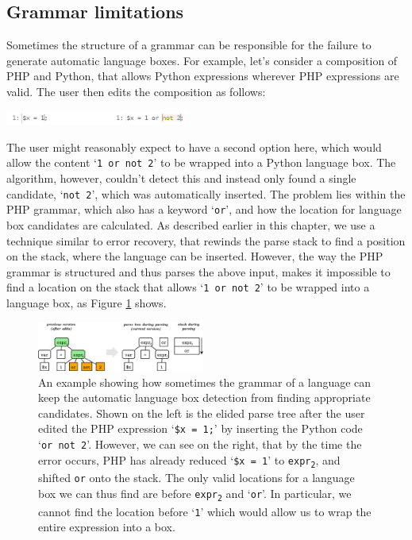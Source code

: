 \documentclass[sigplan,screen]{acmart}\settopmatter{printfolios=true,printccs=false,printacmref=false}
\newcommand{\qtt}[1]{`\texttt{#1}'\xspace}
\begin{document}
\subsection{Grammar limitations}


Sometimes the structure of a grammar can be responsible for the failure to
generate automatic language boxes. For example, let's consider a composition of
PHP and Python, that allows Python expressions wherever PHP expressions are
valid. The user then edits the composition as follows:

\begin{center}
\includegraphics[width=0.45\textwidth]{images/autobox_limitphpgrammar.png}
\end{center}

The user might reasonably expect to have a second option here, which would
allow the content \qtt{1 or not 2} to be wrapped into a Python language box.
The algorithm, however, couldn't detect this and instead only found a single
candidate, \qtt{not 2}, which was automatically inserted.  The problem lies
within the PHP grammar, which also has a keyword \qtt{or}, and how the location
for language box candidates are calculated. As described earlier in this
chapter, we use a technique similar to error recovery, that rewinds the parse
stack to find a position on the stack, where the language can be inserted.
However, the way the PHP grammar is structured and thus parses the above input,
makes it impossible to find a location on the stack that allows \qtt{1 or not
2} to be wrapped into a language box, as Figure \ref{fig_auto_phplimit} shows.

\begin{figure}
\begin{center}
\includegraphics[width=0.49\textwidth]{images/limitation_php}
\end{center}
\caption{An example showing how sometimes the grammar of a language can
keep the automatic language box detection from finding appropriate candidates.
Shown on the left is the elided parse tree after the user edited the PHP expression
\qtt{\$x = 1;} by inserting the Python code \qtt{or not 2}. However, we
can see on the right, that by the time the error occurs, PHP has already reduced \qtt{\$x = 1} to \texttt{expr\textsubscript{2}}, and shifted
\texttt{or} onto the stack. The only valid locations for a language
box we can thus find are before \texttt{expr\textsubscript{2}} and \qtt{or}. In particular,
we cannot find the location before \qtt{1} which would allow us to wrap the entire expression
into a box.}
\label{fig_auto_phplimit}
\end{figure}
\end{document}
